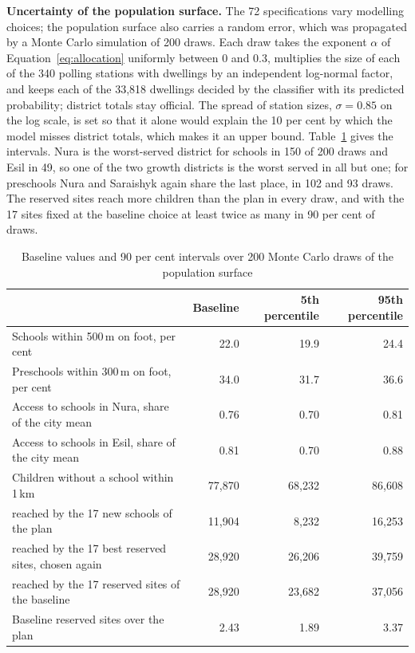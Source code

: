 \textbf{Uncertainty of the population surface.} The 72 specifications vary modelling choices; the population surface also carries a random error, which was propagated by a Monte Carlo simulation of 200 draws. Each draw takes the exponent $\alpha$ of Equation~\eqref{eq:allocation} uniformly between 0 and 0.3, multiplies the size of each of the 340 polling stations with dwellings by an independent log-normal factor, and keeps each of the 33,818 dwellings decided by the classifier with its predicted probability; district totals stay official. The spread of station sizes, $\sigma = 0.85$ on the log scale, is set so that it alone would explain the 10 per cent by which the model misses district totals, which makes it an upper bound. Table~\ref{tab:uncertainty} gives the intervals. Nura is the worst-served district for schools in 150 of 200 draws and Esil in 49, so one of the two growth districts is the worst served in all but one; for preschools Nura and Saraishyk again share the last place, in 102 and 93 draws. The reserved sites reach more children than the plan in every draw, and with the 17 sites fixed at the baseline choice at least twice as many in 90 per cent of draws.

\begin{table}[ht]
\centering
\caption{Baseline values and 90 per cent intervals over 200 Monte Carlo draws of the population surface}
\label{tab:uncertainty}
\small
\begin{tabular}{lrrr}
\toprule
& Baseline & 5th percentile & 95th percentile \\
\midrule
Schools within 500\,m on foot, per cent & 22.0 & 19.9 & 24.4 \\
Preschools within 300\,m on foot, per cent & 34.0 & 31.7 & 36.6 \\
Access to schools in Nura, share of the city mean & 0.76 & 0.70 & 0.81 \\
Access to schools in Esil, share of the city mean & 0.81 & 0.70 & 0.88 \\
Children without a school within 1\,km & 77,870 & 68,232 & 86,608 \\
\quad reached by the 17 new schools of the plan & 11,904 & 8,232 & 16,253 \\
\quad reached by the 17 best reserved sites, chosen again & 28,920 & 26,206 & 39,759 \\
\quad reached by the 17 reserved sites of the baseline & 28,920 & 23,682 & 37,056 \\
Baseline reserved sites over the plan & 2.43 & 1.89 & 3.37 \\
\bottomrule
\end{tabular}
\end{table}

